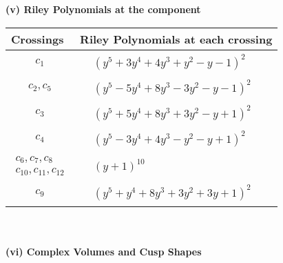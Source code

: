 \documentclass[1p]{elsarticle_modified}
\theoremstyle{definition}
\begin{document}
\flushleft \textbf{(v) Riley Polynomials at the component}\newline \\
\begin{tabular}{m{50pt}|m{274pt}}
Crossings & \hspace{64pt}Riley Polynomials at each crossing \\
\hline $$\begin{aligned}c_{1}\end{aligned}$$&$\begin{aligned}
&(y^5+3 y^4+4 y^3+y^2- y-1)^2
\end{aligned}$\\
\hline $$\begin{aligned}c_{2},c_{5}\end{aligned}$$&$\begin{aligned}
&(y^5-5 y^4+8 y^3-3 y^2- y-1)^2
\end{aligned}$\\
\hline $$\begin{aligned}c_{3}\end{aligned}$$&$\begin{aligned}
&(y^5+5 y^4+8 y^3+3 y^2- y+1)^2
\end{aligned}$\\
\hline $$\begin{aligned}c_{4}\end{aligned}$$&$\begin{aligned}
&(y^5-3 y^4+4 y^3- y^2- y+1)^2
\end{aligned}$\\
\hline $$\begin{aligned}c_{6},c_{7},c_{8}\\c_{10},c_{11},c_{12}\end{aligned}$$&$\begin{aligned}
&(y+1)^{10}
\end{aligned}$\\
\hline $$\begin{aligned}c_{9}\end{aligned}$$&$\begin{aligned}
&(y^5+y^4+8 y^3+3 y^2+3 y+1)^2
\end{aligned}$\\
\hline
\end{tabular}\\~\\
\newpage\flushleft \textbf{(vi) Complex Volumes and Cusp Shapes}
\end{document}
